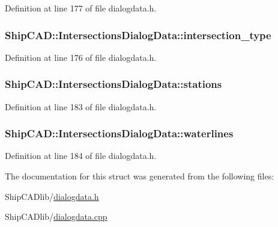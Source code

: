 Definition at line 177 of file dialogdata.\+h.

\subsubsection[{\texorpdfstring{intersection\+\_\+type}{intersection_type}}]{ Ship\+C\+A\+D\+::\+Intersections\+Dialog\+Data\+::intersection\+\_\+type}\hypertarget{structShipCAD_1_1IntersectionsDialogData_a45fdbb695bb58187c24037aba1eabca6}{}\label{structShipCAD_1_1IntersectionsDialogData_a45fdbb695bb58187c24037aba1eabca6}


Definition at line 176 of file dialogdata.\+h.

\subsubsection[{\texorpdfstring{stations}{stations}}]{ Ship\+C\+A\+D\+::\+Intersections\+Dialog\+Data\+::stations}\hypertarget{structShipCAD_1_1IntersectionsDialogData_a15b25bd4167a7eb4bc24240f98ec83ad}{}\label{structShipCAD_1_1IntersectionsDialogData_a15b25bd4167a7eb4bc24240f98ec83ad}


Definition at line 183 of file dialogdata.\+h.

\subsubsection[{\texorpdfstring{waterlines}{waterlines}}]{ Ship\+C\+A\+D\+::\+Intersections\+Dialog\+Data\+::waterlines}\hypertarget{structShipCAD_1_1IntersectionsDialogData_a239c93bd2e10930a0b73fa4a491b3332}{}\label{structShipCAD_1_1IntersectionsDialogData_a239c93bd2e10930a0b73fa4a491b3332}


Definition at line 184 of file dialogdata.\+h.



The documentation for this struct was generated from the following files\+:\begin{DoxyCompactItemize}
\item 
Ship\+C\+A\+Dlib/\hyperlink{dialogdata_8h}{dialogdata.\+h}\item 
Ship\+C\+A\+Dlib/\hyperlink{dialogdata_8cpp}{dialogdata.\+cpp}\end{DoxyCompactItemize}

